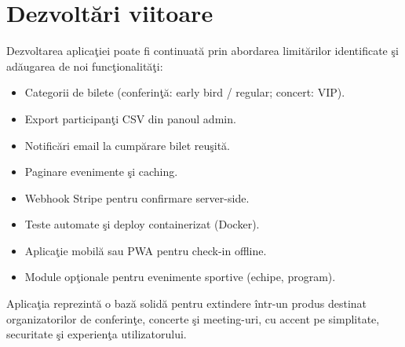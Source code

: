 \section{Dezvolt\u ari viitoare}

Dezvoltarea aplica\c tiei poate fi continuat\u a prin abordarea limit\u arilor identificate \c si ad\u augarea de noi func\c tionalit\u a\c ti:

\begin{itemize}
	\item Categorii de bilete (conferin\c t\u a: early bird / regular; concert: VIP).
	\item Export participan\c ti CSV din panoul admin.
	\item Notific\u ari email la cump\u arare bilet reu\c sit\u a.
	\item Paginare evenimente \c si caching.
	\item Webhook Stripe pentru confirmare server-side.
	\item Teste automate \c si deploy containerizat (Docker).
	\item Aplica\c tie mobil\u a sau PWA pentru check-in offline.
	\item Module op\c tionale pentru evenimente sportive (echipe, program).
\end{itemize}

Aplica\c tia reprezint\u a o baz\u a solid\u a pentru extindere \^intr-un produs destinat organizatorilor de conferin\c te, concerte \c si meeting-uri, cu accent pe simplitate, securitate \c si experien\c ta utilizatorului.